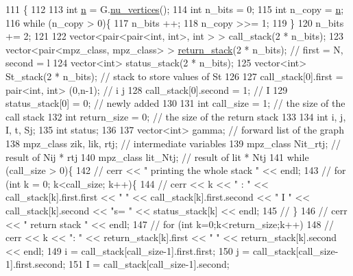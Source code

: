 \begin{DoxyCode}
111 \{
112 
113   \textcolor{keywordtype}{int} \hyperlink{classgraph__encoder_a7fedc9ace19e34abb32f1851c8597591}{n} = G.\hyperlink{classgraph_a70a6e0e4e0a874ab122405abd38f83cd}{nu\_vertices}();
114   \textcolor{keywordtype}{int} n\_bits = 0;
115   \textcolor{keywordtype}{int} n\_copy = \hyperlink{classgraph__encoder_a7fedc9ace19e34abb32f1851c8597591}{n};
116   \textcolor{keywordflow}{while} (n\_copy > 0)\{
117     n\_bits ++;
118     n\_copy >>= 1;
119   \}
120   n\_bits += 2;
121 
122   vector<pair<pair<int, int>, \textcolor{keywordtype}{int} > > call\_stack(2 * n\_bits);
123   vector<pair<mpz\_class, mpz\_class> > \hyperlink{namespacehelper__vars_a6d2100c373830cacd232319a9958652d}{return\_stack}(2 * n\_bits); \textcolor{comment}{// first = N, second = l}
124   vector<int> status\_stack(2 * n\_bits);
125   vector<int> St\_stack(2 * n\_bits); \textcolor{comment}{// stack to store values of St}
126 
127   call\_stack[0].first = pair<int, int> (0,n-1); \textcolor{comment}{// i j }
128   call\_stack[0].second = 1; \textcolor{comment}{// I}
129   status\_stack[0] = 0; \textcolor{comment}{// newly added}
130 
131   \textcolor{keywordtype}{int} call\_size = 1; \textcolor{comment}{// the size of the call stack}
132   \textcolor{keywordtype}{int} return\_size = 0; \textcolor{comment}{// the size of the return stack}
133 
134   \textcolor{keywordtype}{int} i, j, I, t, Sj;
135   \textcolor{keywordtype}{int} status;
136 
137   vector<int> gamma; \textcolor{comment}{// forward list  of the graph}
138   mpz\_class zik, lik, rtj; \textcolor{comment}{// intermediate variables}
139   mpz\_class Nit\_rtj; \textcolor{comment}{// result of Nij * rtj}
140   mpz\_class lit\_Ntj; \textcolor{comment}{// result of lit * Ntj }
141   \textcolor{keywordflow}{while} (call\_size > 0)\{
142     \textcolor{comment}{// cerr << " printing the whole stack " << endl;}
143     \textcolor{comment}{// for (int k = 0; k<call\_size; k++)\{}
144     \textcolor{comment}{//   cerr << k << " : " << call\_stack[k].first.first << " " << call\_stack[k].first.second << " I " <<
       call\_stack[k].second << "s= " << status\_stack[k] << endl;}
145     \textcolor{comment}{// \}}
146     \textcolor{comment}{// cerr << " return stack " << endl;}
147     \textcolor{comment}{// for (int k=0;k<return\_size;k++)}
148     \textcolor{comment}{//   cerr << k << ": " << return\_stack[k].first << " " << return\_stack[k].second << endl;}
149     i = call\_stack[call\_size-1].first.first;
150     j = call\_stack[call\_size-1].first.second;
151     I = call\_stack[call\_size-1].second;

\end{DoxyCode}
